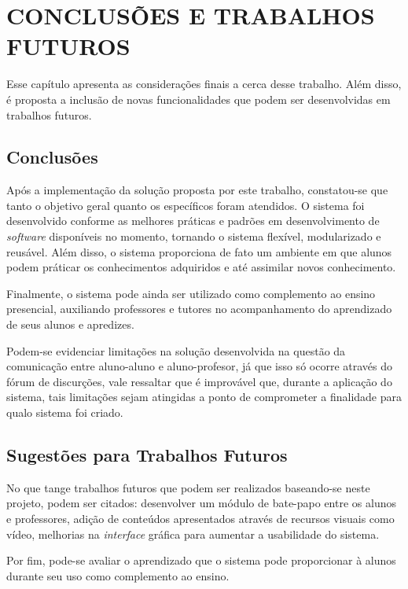 \chapter{CONCLUSÕES E TRABALHOS FUTUROS}
\label{chap:conclusoes-e-trabalhos-futuros}

Esse capítulo apresenta as considerações finais a cerca desse trabalho. Além disso, é proposta a inclusão de novas funcionalidades que podem ser desenvolvidas em trabalhos futuros.

\section{Conclusões}

Após a implementação da solução proposta por este trabalho, constatou-se que tanto o objetivo geral quanto os específicos foram atendidos. O sistema foi desenvolvido conforme as melhores práticas e padrões em desenvolvimento de \textit{software} disponíveis no momento, tornando o sistema flexível, modularizado e reusável. Além disso, o sistema proporciona de fato um ambiente em que alunos podem práticar os conhecimentos adquiridos e até assimilar novos conhecimento. 

Finalmente, o sistema pode ainda ser utilizado como complemento ao ensino presencial, auxiliando professores e tutores no acompanhamento do aprendizado de seus alunos e apredizes.

Podem-se evidenciar limitações na solução desenvolvida na questão da comunicação entre aluno-aluno e aluno-profesor, já que isso só ocorre através do fórum de discurções, vale ressaltar que é improvável que, durante a aplicação do sistema, tais limitações sejam atingidas a ponto de comprometer a finalidade para qualo sistema foi criado.

\section{Sugestões para Trabalhos Futuros}

No que tange trabalhos futuros que podem ser realizados baseando-se neste projeto, podem ser citados: desenvolver um módulo de bate-papo entre os alunos e professores, adição de conteúdos apresentados através de recursos visuais como vídeo, melhorias na \textit{interface} gráfica para aumentar a usabilidade do sistema. 

Por fim, pode-se avaliar o aprendizado que o sistema pode proporcionar à alunos durante seu uso como complemento ao ensino.



